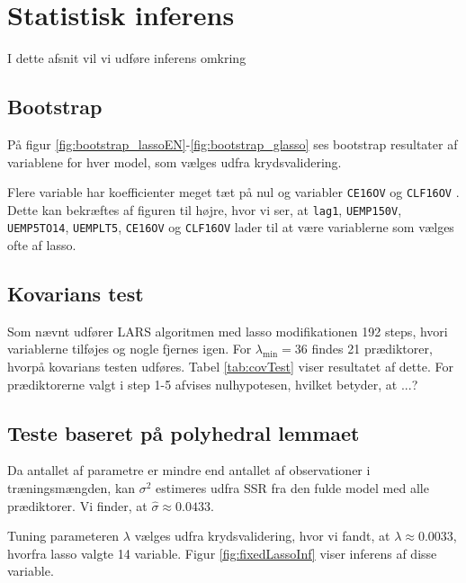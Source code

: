 \section{Statistisk inferens}
I dette afsnit vil vi udføre inferens omkring


\subsection{Bootstrap}
På figur \ref{fig:bootstrap_lassoEN}-\ref{fig:bootstrap_glasso} ses bootstrap resultater af variablene for hver model, som vælges udfra krydsvalidering.

Flere variable har koefficienter meget tæt på nul og 
variabler \texttt{CE16OV} og \texttt{CLF16OV} .
Dette kan bekræftes af figuren til højre, hvor vi ser, at \texttt{lag1}, \texttt{UEMP150V}, \texttt{UEMP5TO14}, \texttt{UEMPLT5}, \texttt{CE16OV} og \texttt{CLF16OV} lader til at være variablerne som vælges ofte af lasso.
%
%
%



\newpage
\subsection{Kovarians test}
Som nævnt udfører LARS algoritmen med lasso modifikationen 192 steps, hvori variablerne tilføjes og nogle fjernes igen.
For \(\lambda_\text{min} = 36\) findes 21 prædiktorer, hvorpå kovarians testen udføres.
Tabel \ref{tab:covTest} viser resultatet af dette.
For prædiktorerne valgt i step 1-5 afvises nulhypotesen, hvilket betyder, at ...?
%

%


\newpage
\subsection{Teste baseret på polyhedral lemmaet}
Da antallet af parametre er mindre end antallet af observationer i træningsmængden, kan \(\sigma^2\) estimeres udfra SSR fra den fulde model med alle prædiktorer.
Vi finder, at \(\widehat{\sigma} \approx 0.0433\).

Tuning parameteren \(\lambda\) vælges udfra krydsvalidering, hvor vi fandt, at \(\lambda \approx 0.0033\), hvorfra lasso valgte 14 variable.
Figur \ref{fig:fixedLassoInf} viser inferens af disse variable.


